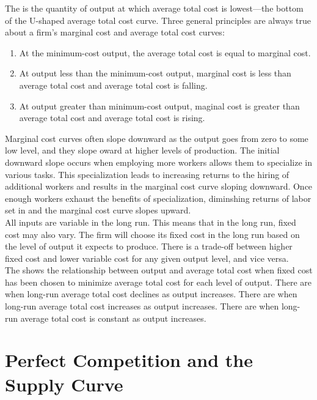 \documentclass{article}
\begin{document}
The  is the quantity of output at which average total cost is lowest---the bottom of the U-shaped average total cost curve. Three general principles are always true about a firm's marginal cost and average total cost curves: 
\begin{enumerate}
  \item At the minimum-cost output, the average total cost is equal to marginal cost. 
  \item At output less than the minimum-cost output, marginal cost is less than average total cost and average total cost is falling. 
  \item At output greater than minimum-cost output, maginal cost is greater than average total cost and average total cost is rising. 
\end{enumerate}

Marginal cost curves often slope downward as the output goes from zero to some low level, and they slope oward at higher levels of production. The initial downward slope occurs when employing more workers allows them to specialize in various tasks. This specialization leads to increasing returns to the hiring of additional workers and results in the marginal cost curve sloping downward. Once enough workers exhaust the benefits of specialization, diminshing returns of labor set in and the marginal cost curve slopes upward. \\ 

All inputs are variable in the long run. This means that in the long run, fixed cost may also vary. The firm will choose its fixed cost in the long run based on the level of output it expects to produce. There is a trade-off between higher fixed cost and lower variable cost for any given output level, and vice versa. \\ 

The  shows the relationship between output and average total cost when fixed cost has been chosen to minimize average total cost for each level of output. There are  when long-run average total cost declines as output increases. There are  when long-run average total cost increases as output increases. There are  when long-run average total cost is constant as output increases. 

\section{Perfect Competition and the Supply Curve}
\end{document}
